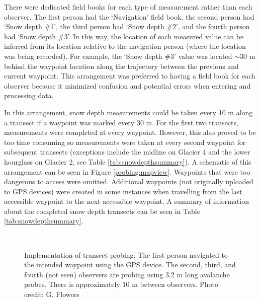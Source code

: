 \documentclass[12pt]{article}
\begin{document}
There were dedicated field books for each type of measurement rather than each observer. The first person had the `Navigation' field book, the second person had `Snow depth \#1', the third person had `Snow depth \#2', and the fourth person had `Snow depth \#3'. In this way, the location of each measured value can be inferred from its location relative to the navigation person (where the location was being recorded). For example, the `Snow depth \#3' value was located $\sim$30 m behind the waypoint location along the trajectory between the previous and current waypoint. This arrangement was preferred to having a field book for each observer because it minimized confusion and potential errors when entering and processing data.

In this arrangement, snow depth measurements could be taken every 10 m along a transect if a waypoint was marked every 30 m. For the first two transects, measurements were completed at every waypoint. However, this also proved to be too time consuming so measurements were taken at every second waypoint for subsequent transects (exceptions include the midline on Glacier 4 and the lower hourglass on Glacier 2, see Table \ref{tab:snowdepthsummary}). A schematic of this arrangement can be seen in Figure \ref{probing:mapview}. Waypoints that were too dangerous to access were omitted. Additional waypoints (not originally uploaded to GPS devices) were created in some instances when travelling from the last accessible waypoint to the next accessible waypoint. A summary of information about the completed snow depth transects can be seen in Table \ref{tab:snowdepthsummary}.

\begin{figure}
	\centering
	\\
	\caption{Implementation of transect probing. The first person navigated to the intended waypoint using the GPS device. The second, third, and fourth (not seen) observers are probing using 3.2 m long avalanche probes. There is approximately 10 m between observers. Photo credit: G. Flowers}
	\label{photo_probing}
	\end{figure}
\end{document}
